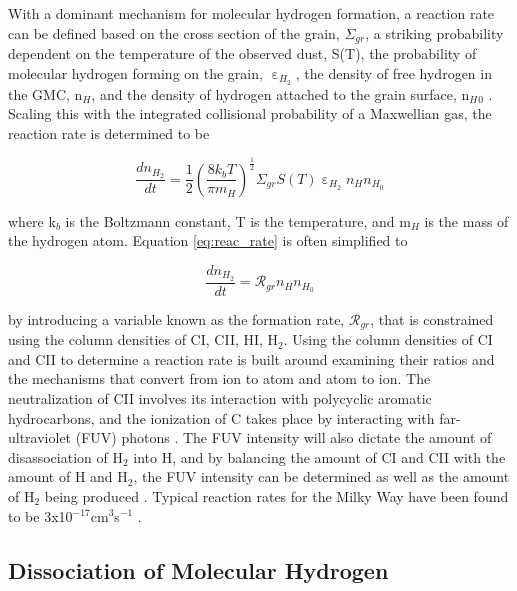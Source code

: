 
With a dominant mechanism for molecular hydrogen formation, a reaction rate can be defined based on the cross section of the grain, $\Sigma_{gr}$, a striking probability dependent on the temperature of the observed dust, S(T), the probability of molecular hydrogen forming on the grain, $\upepsilon_{H_2}$, the density of free hydrogen in the GMC, n$_H$, and the density of hydrogen attached to the grain surface, n$_H{_0}$ \citep{krumholz2014}.  Scaling this with the integrated collisional probability of a Maxwellian gas, the reaction rate is determined to be

\begin{equation}\label{eq:reac_rate}
  \frac{dn_{H_2}}{dt} = \frac{1}{2}\left(\frac{8k_bT}{\pi m_H}\right)^\frac{1}{2}\Sigma_{gr}S\left(T\right)\upepsilon_{H_2}n_{H}n_{H_0}
\end{equation}

\noindent where k$_b$ is the Boltzmann constant, T is the temperature, and m$_H$ is the mass of the hydrogen atom.  Equation \ref{eq:reac_rate} is often simplified to 

\begin{equation}\label{eq:reac_rate_sm}
  \frac{dn_{H_2}}{dt} = \mathcal{R}_{gr}n_H n_{H_0}
\end{equation}

\noindent by introducing a variable known as the formation rate, $\mathcal{R}_{gr}$, that is constrained using the column densities of CI, CII, HI, H$_2$.  Using the column densities of CI and CII to determine a reaction rate is built around examining their ratios and the mechanisms that convert from ion to atom and atom to ion.  The neutralization of CII involves its interaction with polycyclic aromatic hydrocarbons, and the ionization of C takes place by interacting with far-ultraviolet (FUV) photons \citep{wolfire2008}.  The FUV intensity will also dictate the amount of disassociation of H$_2$ into H, and by balancing the amount of CI and CII with the amount of H and H$_2$, the FUV intensity can be determined as well as the amount of H$_2$ being produced \citep{wolfire2008}.  Typical reaction rates for the Milky Way have been found to be 3x10$^{-17}$cm$^3$s$^{-1}$ \citep{jura1975, gry2002, wolfire2008}.

\subsection{Dissociation of Molecular Hydrogen}\label{h2destroy}

